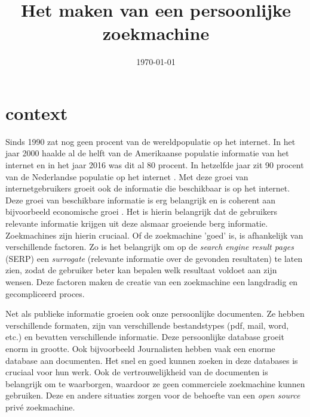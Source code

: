 \documentclass{uva-inf-article}
\title{Het maken van een persoonlijke zoekmachine}
\date{\today}
\begin{document}
\maketitle




\section{context}
Sinds 1990 zat nog geen procent van de wereldpopulatie op het internet. In het jaar 2000 haalde al de helft van de Amerikaanse populatie informatie van het internet en in het jaar 2016 was dit al 80 procent. In hetzelfde jaar zit 90 procent van de Nederlandse populatie op het internet \parencite{owidinternet}. Met deze groei van internetgebruikers groeit ook de informatie die beschikbaar is op het internet. Deze groei van beschikbare informatie is erg belangrijk en is coherent aan bijvoorbeeld economische groei \parencite{Vu2019}. Het is hierin belangrijk dat de gebruikers relevante informatie krijgen uit deze alsmaar groeiende berg informatie. Zoekmachines zijn hierin cruciaal. Of de zoekmachine 'goed' is, is afhankelijk van verschillende factoren. Zo is het belangrijk om op de \textit{search engine result pages} (SERP) een \textit{surrogate} (relevante informatie over de gevonden resultaten) te laten zien, zodat de gebruiker beter kan bepalen welk resultaat voldoet aan zijn wensen. Deze factoren maken de creatie van een zoekmachine een langdradig en gecompliceerd proces. 

Net als publieke informatie groeien ook onze persoonlijke documenten. Ze hebben verschillende formaten, zijn van verschillende bestandstypes (pdf, mail, word, etc.) en bevatten verschillende informatie. Deze persoonlijke database groeit enorm in grootte. Ook bijvoorbeeld Journalisten hebben vaak een enorme database aan documenten. Het snel en goed kunnen zoeken in deze databases is cruciaal voor hun werk. Ook de vertrouwelijkheid van de documenten is belangrijk om te waarborgen, waardoor ze geen commerciele zoekmachine kunnen gebruiken.  Deze en andere situaties zorgen voor de behoefte van een \textit{open source} privé zoekmachine. 
\end{document}
